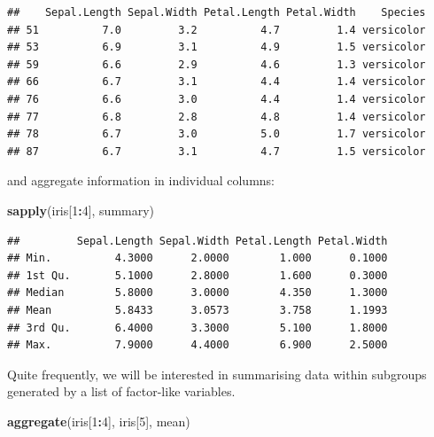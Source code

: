 \documentclass[10pt,b5paper,krantz1]{krantz}
\newenvironment{Shaded}{\begin{snugshade}}{\end{snugshade}}
\newcommand{\DecValTok}[1]{\textcolor[rgb]{0.06,0.06,0.06}{#1}}
\newcommand{\FloatTok}[1]{\textcolor[rgb]{0.06,0.06,0.06}{#1}}
\newcommand{\KeywordTok}[1]{\textcolor[rgb]{0.27,0.27,0.27}{\textbf{#1}}}
\newcommand{\NormalTok}[1]{#1}
\newcommand{\OperatorTok}[1]{\textcolor[rgb]{0.43,0.43,0.43}{\textbf{#1}}}
\newcommand{\StringTok}[1]{\textcolor[rgb]{0.5,0.5,0.5}{#1}}
\begin{document}
\begin{Shaded}
\end{Shaded}

\begin{verbatim}
##    Sepal.Length Sepal.Width Petal.Length Petal.Width    Species
## 51          7.0         3.2          4.7         1.4 versicolor
## 53          6.9         3.1          4.9         1.5 versicolor
## 59          6.6         2.9          4.6         1.3 versicolor
## 66          6.7         3.1          4.4         1.4 versicolor
## 76          6.6         3.0          4.4         1.4 versicolor
## 77          6.8         2.8          4.8         1.4 versicolor
## 78          6.7         3.0          5.0         1.7 versicolor
## 87          6.7         3.1          4.7         1.5 versicolor
\end{verbatim}

and aggregate information in individual columns:

\begin{Shaded}
\begin{Highlighting}[]
\KeywordTok{sapply}\NormalTok{(iris[}\DecValTok{1}\OperatorTok{:}\DecValTok{4}\NormalTok{], summary)}
\end{Highlighting}
\end{Shaded}

\begin{verbatim}
##         Sepal.Length Sepal.Width Petal.Length Petal.Width
## Min.          4.3000      2.0000        1.000      0.1000
## 1st Qu.       5.1000      2.8000        1.600      0.3000
## Median        5.8000      3.0000        4.350      1.3000
## Mean          5.8433      3.0573        3.758      1.1993
## 3rd Qu.       6.4000      3.3000        5.100      1.8000
## Max.          7.9000      4.4000        6.900      2.5000
\end{verbatim}

Quite frequently, we will be interested
in summarising data within subgroups generated by a list of factor-like variables.

\begin{Shaded}
\begin{Highlighting}[]
\KeywordTok{aggregate}\NormalTok{(iris[}\DecValTok{1}\OperatorTok{:}\DecValTok{4}\NormalTok{], iris[}\DecValTok{5}\NormalTok{], mean)}
\end{Highlighting}
\end{Shaded}
\end{document}
